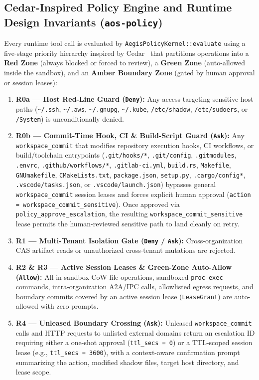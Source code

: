\documentclass[acmsmall,screen,review]{acmart}
\begin{document}
\subsection{Cedar-Inspired Policy Engine and Runtime Design Invariants (\texttt{aos-policy})}
\label{sec:policy}

Every runtime tool call is evaluated by \texttt{AegisPolicyKernel::\allowbreak evaluate} using a five-stage priority hierarchy inspired by Cedar~\cite{cutler2024cedar} that partitions operations into a \textbf{Red Zone} (always blocked or forced to review), a \textbf{Green Zone} (auto-allowed inside the sandbox), and an \textbf{Amber Boundary Zone} (gated by human approval or session leases):
\begin{enumerate}
    \item \textbf{R0a --- Host Red-Line Guard (\texttt{Deny}):} Any access targeting sensitive host paths (\texttt{\textasciitilde/.ssh}, \texttt{\textasciitilde/.aws}, \texttt{\textasciitilde/.gnupg}, \texttt{\textasciitilde/.kube}, \texttt{/etc/shadow}, \texttt{/etc/sudoers}, or \texttt{/System}) is unconditionally denied.
    \item \textbf{R0b --- Commit-Time Hook, CI \& Build-Script Guard (\texttt{Ask}):} Any \texttt{workspace\_commit} that modifies repository execution hooks, CI workflows, or build/toolchain entrypoints (\texttt{.git/hooks/*}, \texttt{.git/config}, \texttt{.gitmodules}, \texttt{.envrc}, \texttt{.github/workflows/*}, \texttt{.gitlab-ci.yml}, \texttt{build.rs}, \texttt{Makefile}, \texttt{GNUmakefile}, \texttt{CMakeLists.txt}, \texttt{package.json}, \texttt{setup.py}, \texttt{.cargo/config*}, \texttt{.vscode/tasks.json}, or \texttt{.vscode/launch.json}) bypasses general \texttt{workspace\_commit} session leases and forces explicit human approval (\texttt{action = workspace\_commit\_sensitive}). Once approved via \texttt{policy\_approve\_escalation}, the resulting \texttt{workspace\_commit\_sensitive} lease permits the human-reviewed sensitive path to land cleanly on retry.
    \item \textbf{R1 --- Multi-Tenant Isolation Gate (\texttt{Deny} / \texttt{Ask}):} Cross-organization CAS artifact reads or unauthorized cross-tenant mutations are rejected.
    \item \textbf{R2 \& R3 --- Active Session Leases \& Green-Zone Auto-Allow (\texttt{Allow}):} All in-sandbox CoW file operations, sandboxed \texttt{proc\_exec} commands, intra-organization A2A/IPC calls, allowlisted egress requests, and boundary commits covered by an active session lease (\texttt{LeaseGrant}) are auto-allowed with zero prompts.
    \item \textbf{R4 --- Unleased Boundary Crossing (\texttt{Ask}):} Unleased \texttt{workspace\_commit} calls and HTTP requests to unlisted external domains return an escalation ID requiring either a one-shot approval (\texttt{ttl\_secs = 0}) or a TTL-scoped session lease (e.g., \texttt{ttl\_secs = 3600}), with a context-aware confirmation prompt summarizing the action, modified shadow files, target host directory, and lease scope.
\end{enumerate}
\end{document}
